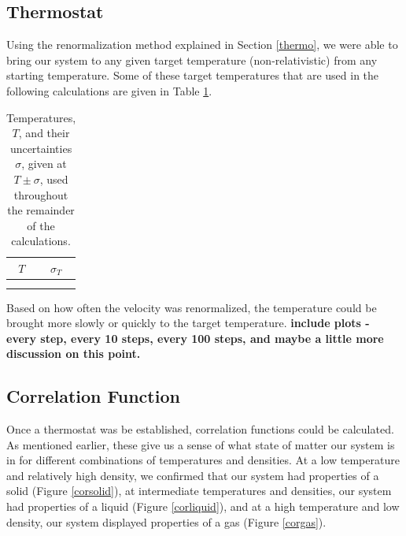 \documentclass{article}
\begin{document}
\begin{multicols}{2}
\subsection{Thermostat}

Using the renormalization method explained in Section \ref{thermo}, we were able to bring our system to any given target temperature (non-relativistic) from any starting temperature.  Some of these target temperatures that are used in the following calculations are given in Table \ref{temptable}.  \\

\begin{table}
\begin{center}
\begin{tabular}{| c | c |}
\hline $T$ & $\sigma_T$ \\ \hline
 &  \\ \hline
 &  \\ \hline
\end{tabular}
\label{temptable}
\caption{Temperatures, $T$, and their uncertainties $\sigma$, given at $T \pm \sigma$, used throughout the remainder of the calculations.}
\end{center}
\end{table}

Based on how often the velocity was renormalized, the temperature could be brought more slowly or quickly to the target temperature.  \textbf{include plots - every step, every 10 steps, every 100 steps, and maybe a little more discussion on this point.}

\subsection{Correlation Function}

Once a thermostat was be established, correlation functions could be calculated.  As mentioned earlier, these give us a sense of what state of matter our system is in for different combinations of temperatures and densities.  At a low temperature and relatively high density, we confirmed that our system had properties of a solid (Figure \ref{corsolid}), at intermediate temperatures and densities, our system had properties of a liquid (Figure \ref{corliquid}), and at a high temperature and low density, our system displayed properties of a gas (Figure \ref{corgas}).  


\end{multicols}
\end{document}

